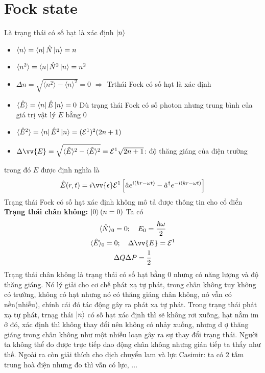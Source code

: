 \documentclass{report}
\newcommand{\mean}[1]{\langle{#1}\rangle}
\newcommand{\f}[2]{\dfrac{#1}{#2}}
\begin{document}
\section{Fock state}
Là trạng thái có số hạt là xác định $\ket{n}$
\begin{itemize}
	\item $\mean{n} = \bra{n} \hat{N} \ket{n} = n$
	\item $\mean{n^{2}} = \bra{n} \hat{N}^{2} \ket{n} = n^{2}$ 
	\item $\Delta n = \sqrt{\mean{n^{2}} - \mean{n}^{2}} = 0$ $\Rightarrow$ Trthái Fock có số hạt là xác định
	\item $\mean{\hat{E}} = \bra{n} \hat{E} \ket{n} = 0$ Dù trạng thái Fock có số photon nhưng trung bình của giá trị vật lý $E$ bằng 0
	\item  $\mean{\hat{E}^{2}} = \bra{n} \hat{E}^{2} \ket{n} = (\mathcal{E}^{1})^{2}(2n + 1)$
	\item $\Delta \vv{E} = \sqrt{\mean{\hat{E}}^{2} - \mean{\hat{E}}^{2}} = \mathcal{E}^{1}\sqrt{2n + 1}$: độ thăng giáng của điện trường
\end{itemize}
trong đó $\hat{E}$ được định nghĩa là
\begin{gather}
	\hat{E}(r,t) = i \vv{\epsilon} \mathcal{E}^{1} \left[ \hat{a} e^{i(kr - \omega t)} - \hat{a}^{\dagger} e^{-i(kr - \omega t)} \right]
\end{gather}
Trạng thái Fock có số hạt xác định không mô tả được thông tin cho cổ điển\\
\textbf{Trạng thái chân không:} $\ket{0}(n = 0)$ Ta có
\begin{gather}
	\mean{\hat{N}}_{0} = 0 ; \quad E_{0} = \f{\hbar \omega}{2}\\
	\mean{\hat{E}}_{0} = 0 ; \quad \Delta \vv{E} = \mathcal{E}^{1}\\
	\Delta Q \Delta P = \f{1}{2}
\end{gather}
Trạng thái chân không là trạng thái có số hạt bằng 0 nhưng có năng lượng và độ thăng giáng. Nó lý giải cho cơ chế phát xạ tự phát, trong chân không tuy không có trường, không có hạt nhưng nó có thăng giáng chân không, nó vẫn có nền(nhiễu), chính cái đó tác động gây ra phát xạ tự phát. Trong trạng thái phát xạ tự phát, trnạg thái $\ket{n}$ có số hạt xác định thì sẽ không rơi xuống, hạt nằm im ở đó, xác định thì không thay đổi nên không có nhảy xuống, nhưng d ợ thăng giáng trong chân không như một nhiễu loạn gây ra sự thay đổi trạng thái. Người ta không thể đo được trực tiếp dao động chân không nhưng gián tiếp ta thấy như thế. Ngoài ra còn giải thích cho dịch chuyển lam và lực Casimir: ta có 2 tấm trung hoà điện nhưng đo thì vẫn có lực, ...
\end{document}
